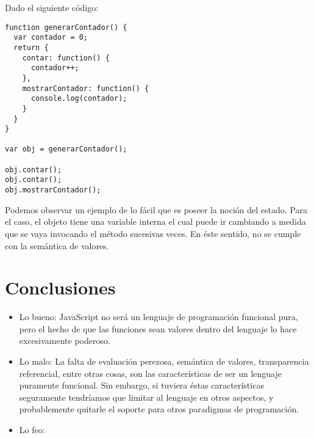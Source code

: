 Dado el siguiente código:

\begin{lstlisting}[title={Noción de estado}]
function generarContador() {
  var contador = 0;
  return {
    contar: function() {
      contador++;
    },
    mostrarContador: function() {
      console.log(contador);
    }
  }
}

var obj = generarContador();

obj.contar();
obj.contar();
obj.mostrarContador();
\end{lstlisting}

Podemos observar un ejemplo de lo fácil que es poseer la noción del estado. Para el caso, el objeto tiene una variable interna  el cual puede ir cambiando a medida que se vaya invocando el método  sucesivas veces. En éste sentido, no se cumple con la semántica de valores.

\section{Conclusiones}

\begin{itemize}
\item Lo bueno: 
JavaScript no será un lenguaje de programación funcional pura, pero el hecho de que las funciones sean valores dentro del lenguaje lo hace excesivamente poderoso. 
\item Lo malo: 
La falta de evaluación perezosa, semántica de valores, transparencia referencial, entre otras cosas, son las características de ser un lenguaje puramente funcional. Sin embargo, si tuviera éstas características seguramente tendríamos que limitar al lenguaje en otros aspectos, y probablemente quitarle el soporte para otros paradigmas de programación.
\item Lo feo: 

\end{itemize}